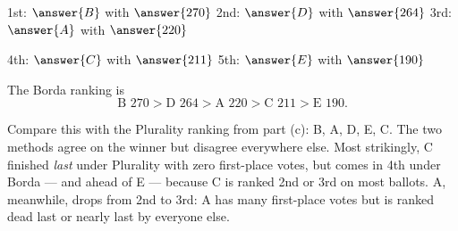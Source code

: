 \documentclass[12pt]{ximera}
\begin{document}
\begin{problem}
\begin{prompt}
1st: $\answer{B}$ with $\answer{270}$ \qquad
2nd: $\answer{D}$ with $\answer{264}$ \qquad
3rd: $\answer{A}$ with $\answer{220}$

\smallskip
4th: $\answer{C}$ with $\answer{211}$ \qquad
5th: $\answer{E}$ with $\answer{190}$

\begin{feedback}
The Borda ranking is
\[ \text{B } 270 > \text{D } 264 > \text{A } 220 > \text{C } 211 > \text{E } 190. \]

Compare this with the Plurality ranking from part (c): B, A, D, E, C. The two methods
agree on the winner but disagree everywhere else. Most strikingly, C finished
\emph{last} under Plurality with zero first-place votes, but comes in 4th under Borda
--- and ahead of E --- because C is ranked 2nd or 3rd on most ballots. A, meanwhile,
drops from 2nd to 3rd: A has many first-place votes but is ranked dead last or nearly
last by everyone else.
\end{feedback}
\end{prompt}
\end{problem}
\end{document}
